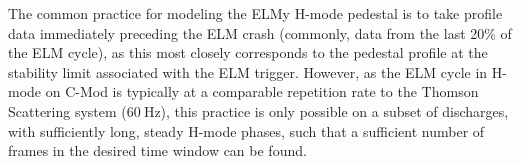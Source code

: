 The common practice for modeling the ELMy H-mode pedestal is to take profile data immediately preceding the ELM crash (commonly, data from the last 20\% of the ELM cycle), as this most closely corresponds to the pedestal profile at the stability limit associated with the ELM trigger.  However, as the ELM cycle in H-mode on C-Mod is typically at a comparable repetition rate to the Thomson Scattering system ($\SI{60}{\hertz}$), this practice is only possible on a subset of discharges, with sufficiently long, steady H-mode phases, such that a sufficient number of frames in the desired time window can be found.

\begin{figure}[h]
 \pushtooutside
\end{figure}

